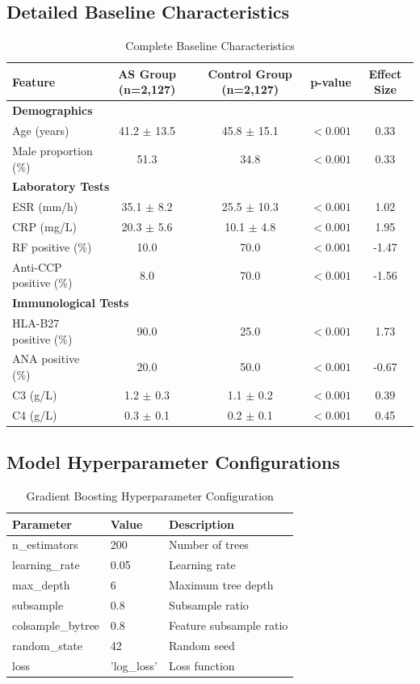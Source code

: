 \documentclass[12pt, a4paper]{article}
\begin{document}
\subsection{Detailed Baseline Characteristics}
\begin{table}[htbp]
\centering
\caption{Complete Baseline Characteristics}
\label{tab:baseline_char}
\begin{tabular}{@{}lcccc@{}}
\toprule
\textbf{Feature} & \textbf{AS Group (n=2,127)} & \textbf{Control Group (n=2,127)} & \textbf{p-value} & \textbf{Effect Size} \\ \midrule
\multicolumn{5}{l}{\textbf{Demographics}} \\
Age (years) & 41.2 $\pm$ 13.5 & 45.8 $\pm$ 15.1 & $<0.001$ & 0.33 \\
Male proportion (\%) & 51.3 & 34.8 & $<0.001$ & 0.33 \\
\multicolumn{5}{l}{\textbf{Laboratory Tests}} \\
ESR (mm/h) & 35.1 $\pm$ 8.2 & 25.5 $\pm$ 10.3 & $<0.001$ & 1.02 \\
CRP (mg/L) & 20.3 $\pm$ 5.6 & 10.1 $\pm$ 4.8 & $<0.001$ & 1.95 \\
RF positive (\%) & 10.0 & 70.0 & $<0.001$ & -1.47 \\
Anti-CCP positive (\%) & 8.0 & 70.0 & $<0.001$ & -1.56 \\
\multicolumn{5}{l}{\textbf{Immunological Tests}} \\
HLA-B27 positive (\%) & 90.0 & 25.0 & $<0.001$ & 1.73 \\
ANA positive (\%) & 20.0 & 50.0 & $<0.001$ & -0.67 \\
C3 (g/L) & 1.2 $\pm$ 0.3 & 1.1 $\pm$ 0.2 & $<0.001$ & 0.39 \\
C4 (g/L) & 0.3 $\pm$ 0.1 & 0.2 $\pm$ 0.1 & $<0.001$ & 0.45 \\ \bottomrule
\end{tabular}
\end{table}

\subsection{Model Hyperparameter Configurations}
\begin{table}[htbp]
\centering

\begin{tabular}{@{}lll@{}}
\toprule
\textbf{Parameter} & \textbf{Value} & \textbf{Description} \\ \midrule
n\_estimators & 200 & Number of trees \\
learning\_rate & 0.05 & Learning rate \\
max\_depth & 6 & Maximum tree depth \\
subsample & 0.8 & Subsample ratio \\
colsample\_bytree & 0.8 & Feature subsample ratio \\
random\_state & 42 & Random seed \\
loss & 'log\_loss' & Loss function \\ \bottomrule
\end{tabular}%

\caption{Gradient Boosting Hyperparameter Configuration}
\label{tab:gb_hyperparams}
\end{table}
\end{document}
